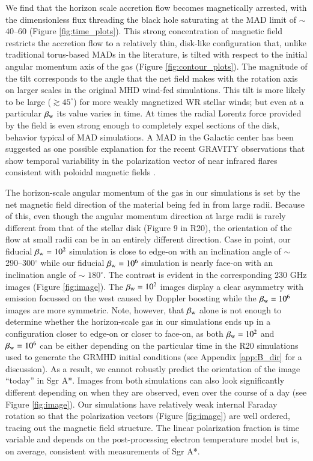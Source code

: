 \documentclass[twocolumn,twocolappendix,apjl,appendixfloats]{aastex63}
\begin{document}
We find that the horizon scale accretion flow becomes magnetically arrested, with the dimensionless flux threading the black hole saturating at the MAD limit of $\sim$ 40--60 (Figure \ref{fig:time_plots}).
This strong concentration of magnetic field restricts the accretion flow to a relatively thin, disk-like configuration that, unlike traditional torus-based MADs in the literature, is tilted with respect to the initial angular momentum axis of the gas (Figure \ref{fig:contour_plots}).  The magnitude of the tilt corresponds to the angle that the net field makes with the rotation axis on larger scales in the original MHD wind-fed simulations.  This tilt is more likely to be large ($\gtrsim 45^\circ$) for more weakly magnetized WR stellar winds; but even at a particular $\beta_{\rm w}$ its value varies in time.  At times the radial Lorentz force provided by the field is even strong enough to completely expel sections of the disk, behavior typical of MAD simulations.   
A MAD in the Galactic center has been suggested as one possible explanation for the recent GRAVITY  observations that show temporal variability in the polarization vector of near infrared flares consistent with poloidal magnetic fields \citep{GRAVITYFlare}.   

The horizon-scale angular momentum of the gas in our simulations is set by the net magnetic field direction of the material being fed in from large radii.  Because of this, even though the angular momentum direction at large radii is rarely different from that of the stellar disk (Figure 9 in R20), the orientation of the flow at small radii can be in an entirely different direction.
Case in point, our fiducial $\beta_{\rm w}=10^2$ simulation is close to edge-on with an inclination angle of $\sim$ 290--300$^\circ$ while our fiducial $\beta_{\rm w} = 10^6$ simulation is nearly face-on with an inclination angle of $\sim$ $180^\circ$.  The contrast is evident in the corresponding 230 GHz images (Figure \ref{fig:image}).   The $\beta_{\rm w}=10^2$ images display a clear asymmetry with emission focussed on the west caused by Doppler boosting while the $\beta_{\rm w}=10^6$ images are more symmetric. Note, however, that $\beta_{\rm w}$ alone is not enough to determine whether the horizon-scale gas in our simulations ends up in a configuration closer to edge-on or closer to face-on, as both $\beta_{\rm w}=10^2$ and $\beta_{\rm w}=10^6$ can be either depending on the particular time in the R20 simulations used to generate the GRMHD initial conditions (see Appendix \ref{app:B_dir} for a discussion). 
As a result, we cannot robustly predict the orientation of the image ``today'' in Sgr A*. 
Images from both simulations can also look significantly different depending on when they are observed, even over the course of a day (see Figure \ref{fig:image}).   
Our simulations have relatively weak internal Faraday rotation so that the polarization vectors (Figure \ref{fig:image}) are well ordered, tracing out the magnetic field structure.    The linear polarization fraction is time variable and depends on the post-processing electron temperature model but is, on average, consistent with measurements of Sgr A*.  
\end{document}
